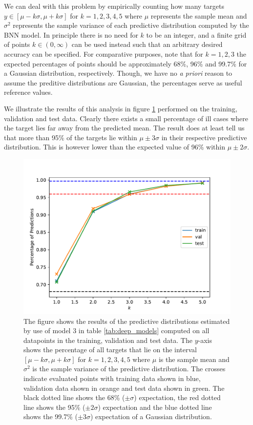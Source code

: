 We can deal with this problem by empirically counting how many targets $y \in [\mu - k\sigma, \mu + k \sigma]$ for $k = 1, 2, 3, 4, 5$ where $\mu$ represents the sample mean and $\sigma^2$ represents the sample variance of each predictive distribution computed by the BNN model. In principle there is no need for $k$ to be an integer, and a finite grid of points $k \in (0, \infty)$ can be used instead such that an arbitrary desired accuracy can be specified. 
For comparative purposes, note that for $k = 1, 2, 3$ the expected percentages of points should be approximately 68\%, 96\% and 99.7\% for a Gaussian distribution, respectively. Though, we have no \textit{a priori} reason to assume the preditive distributions are Gaussian, the percentages serve as useful reference values.

We illustrate the results of this analysis in figure \ref{fig:confidence} performed on the training, validation and test data. Clearly there exists a small percentage of ill cases where the target lies far away from the predicted mean. The result does at least tell us that more than 95\% of the targets lie within $\mu \pm 3\sigma$ in their respective predictive distribution. This is however lower than the expected value of 96\% within $\mu \pm 2\sigma$.
\begin{figure}[H]
    \centering
    \includegraphics[scale=0.7]{figures/confidence_estimation/good_vs_bad_cases_confidence.pdf}
    \caption{
        The figure shows the results of the predictive distributions estimated by use of model 3 in table \ref{tab:deep_models}
        computed on all datapoints in the training, validation and test data. The $y$-axis shows the percentage of all targets that lie on the interval $[\mu - k\sigma, \mu + k\sigma]$ for $k=1,2,3,4,5$ where $\mu$ is the sample mean and $\sigma^2$ is the sample variance of the predictive distribution. The crosses indicate evaluated points with training data shown in blue, validation data shown in orange and test data shown in green. The black dotted line shows the 68\% ($\pm \sigma$) expectation, the red dotted line shows the 95\% ($\pm 2\sigma$) expectation and the blue dotted line shows the 99.7\% ($\pm 3 \sigma$) expectation of a Gaussian distribution.
    }
    \label{fig:confidence}
\end{figure}






